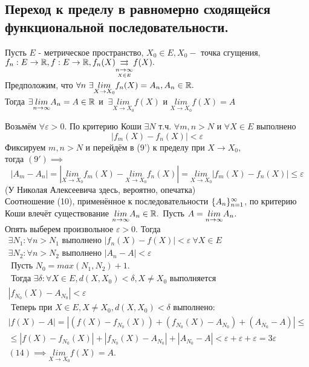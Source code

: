 \documentclass[main]{subfiles}
\begin{document}
\subsection{Переход к пределу в равномерно сходящейся функциональной последовательности.}
\begin{theorem}
     Пусть $E$ - метрическое пространство, $X_0\in E, X_0 - $ точка сгущения,
      $f_n:E\to{\vR}, f:E\to{\vR}, f_n(X){\darrow{\underset{X\in E}{n\to\infty}}}  
      f(X).$\\ Предположим, что $\forall n\ \exists\underset{X\to X_0}{lim}f_n(X)=A_n, A_n\in{\vR}.$\\
       Тогда $\exists\Lim A_n=A\in{\vR}$ и $\ \exists\underset{X\to X_0}{lim}f(X)$ 
       и $\underset{X\to X_0}{lim}f(X)=A$ \end{theorem}
\begin{longProof}
     Возьмём $\forall\varepsilon>0.$ По критерию Коши $\exists N$ т.ч. $\forall m, n>N$ и $\forall X\in E$
      выполнено
       \[|f_m(X)-f_n(X)|<\varepsilon\tag{9'} \]
        Фиксируем $m,n>N$ и перейдём 
      в (9') к пределу при $X\to X_0,$\\ тогда $(9') \implies$
\[ |A_m-A_n|=|\underset{X\to X_0}{lim} f_m(X)-\underset{X\to X_0}{lim} f_n(X)|=\underset{X\to X_0}{lim} |f_m(X)-f_n(X)|\leq \varepsilon\tag{10} \] (У Николая Алексеевича здесь, вероятно, опечатка)\\
Соотношение (10), применённое к последовательности $\fnn[A_n]$, по критерию Коши влечёт существование $\Lim A_n\in{\vR}.$ Пусть $A=\Lim A_n$.\\
Опять выберем произвольное $\varepsilon>0.$ Тогда
\begin{gather*}
\exists N_1: \forall n>N_1 \text{ выполнено } |f_n(X)-f(X)|<\varepsilon\ \forall X\in E\tag{11} \\
\exists N_2: \forall n>N_2 \text{ выполнено } |A_n-A|<\varepsilon \tag{12} \\
\text{ Пусть } N_0=max(N_1,N_2)+1.\\
 \text{ Тогда } \exists\delta: \forall X\in E, d(X,X_0)<\delta, X\neq X_0 \text{ выполняется} \\
|f_{N_0}(X)-A_{N_0}|<\varepsilon\tag{13} \\
\text{ Теперь при } X\in E, X\neq X_0, d(X,X_0)<\delta \text{ выполнено}: \\
|f(X)-A|=|(f(X)-f_{N_0}(X))+(f_{N_0}(X)-A_{N_0})+(A_{N_0}-A)|\leq \\
 \leq |f(X)-f_{N_0}(X)|+|f_{N_0}(X)-A_{N_0}|+|A_{N_0}-A|<\varepsilon+\varepsilon+\varepsilon=3\varepsilon\tag{14} \\
 (14) \implies \underset{X\to X_0}{lim}{f(X)}=A. \end{gather*}
\end{longProof}
\end{document}
